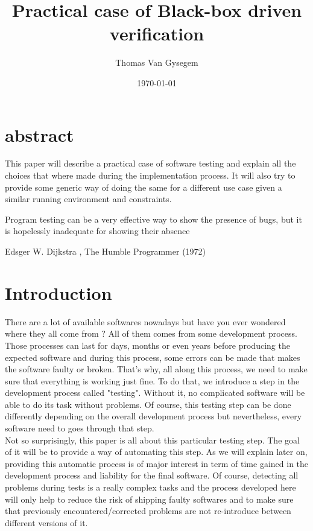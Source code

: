 \documentclass[12pt]{article}
\begin{document}
\title{Practical case of Black-box driven verification}
\author{Thomas Van Gysegem}
\date\today
\maketitle

\section*{abstract}

This paper will describe a practical case of software testing and explain all the choices that where made during the implementation process. It will also try to provide some generic way of doing the same for a different use case given a similar running environment and constraints.

\clearpage
\pagebreak
\hspace{0pt}
\vfill
\epigraph{Program testing can be a very effective way to show the presence of bugs, but it is hopelessly inadequate for showing their absence}{Edsger W. Dijkstra , The Humble Programmer (1972)}
\vfill
\hspace{0pt}
\pagebreak

\clearpage

\tableofcontents

\clearpage

\section{Introduction}

There are a lot of available softwares nowadays but have you ever wondered where they all come from ? All of them comes from some development process. Those processes can last for days, months or even years before producing the expected software and during this process, some errors can be made that makes the software faulty or broken. That's why, all along this process, we need to make sure that everything is working just fine. To do that, we introduce a step in the development process called "testing". Without it, no complicated software will be able to do its task without problems. Of course, this testing step can be done differently depending on the overall development process but nevertheless, every software need to goes through that step.\\

Not so surprisingly, this paper is all about this particular testing step. The goal of it will be to provide a way of automating this step. As we will explain later on, providing this automatic process is of major interest in term of time gained in the development process and liability for the final software. Of course, detecting all problems during tests is a really complex tasks and the process developed here will only help to reduce the risk of shipping faulty softwares and to make sure that previously encountered/corrected problems are not re-introduce between different versions of it.\\
\end{document}
